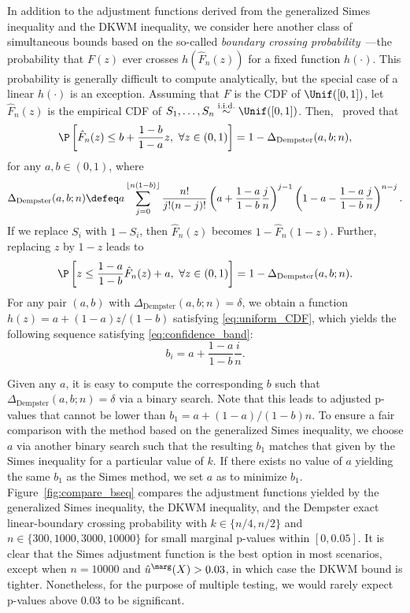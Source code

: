 In addition to the adjustment functions derived from the generalized Simes inequality and the DKWM inequality, we consider here another class of simultaneous bounds based on the so-called \emph{boundary crossing probability}~\cite{dempster1959generalized, durbin1973distribution, kotel1983computing, siegmund1986boundary}---the probability that $F(z)$ ever crosses $h(\hat{F}_{n}(z))$ for a fixed function $h(\cdot)$. This probability is generally difficult to compute analytically, but the special case of a linear $h(\cdot)$ is an exception.
Assuming that $F$ is the CDF of $\Unif([0, 1])$, let $\hat{F}_{n}(z)$ is the empirical CDF of $S_{1}, \ldots, S_{n}\stackrel{\mathrm{i.i.d.}}{\sim}\Unif([0, 1])$. Then,~\cite{dempster1959generalized} proved that
\begin{equation*}
  \P\left[ \hat{F}_{n}(z)\le b + \frac{1 - b}{1 - a}z, \,\, \forall z\in (0, 1)\right] = 1 - \Delta_{\mathrm{Dempster}}(a, b; n),
 \end{equation*}
 for any $a, b\in (0, 1)$, where
 \begin{equation}\label{eq:Delta_Dempster}
  \Delta_{\mathrm{Dempster}}(a, b; n)
  \defeq a\sum_{j=0}^{\lfloor n(1 - b)\rfloor}\frac{n!}{j!(n-j)!}\left( a + \frac{1 - a}{1 - b}\frac{j}{n}\right)^{j-1}\left( 1 - a - \frac{1 - a}{1 - b}\frac{j}{n}\right)^{n-j}.
\end{equation}
 If we replace $S_i$ with $1 - S_i$, then $\hat{F}_{n}(z)$ becomes $1 - \hat{F}_{n}(1 - z)$. Further, replacing $z$ by $1 - z$ leads to
\begin{equation}  \label{eq:dempster}
  \P\left[ z \le \frac{1 - a}{1 - b}\hat{F}_{n}(z) + a, \,\, \forall z\in (0, 1)\right] = 1 - \Delta_{\mathrm{Dempster}}(a, b; n).
\end{equation}
For any pair $(a, b)$ with $\Delta_{\mathrm{Dempster}}(a, b; n) = \delta$, we obtain a function $h(z) = a + (1 - a)z / (1 - b)$ satisfying \eqref{eq:uniform_CDF}, which yields the following sequence satisfying \eqref{eq:confidence_band}:
\[b_{i} = a + \frac{1 - a}{1 - b}\frac{i}{n}.\]

Given any $a$, it is easy to compute the corresponding $b$ such that $\Delta_{\mathrm{Dempster}}(a, b; n) = \delta$ via a binary search.
Note that this leads to adjusted p-values that cannot be lower than $b_1 = a + (1 - a) / (1 - b)n$.
To ensure a fair comparison with the method based on the generalized Simes inequality, we choose $a$ via another binary search such that the resulting $b_1$ matches that given by the Simes inequality for a particular value of $k$.
If there exists no value of $a$ yielding the same $b_1$ as the Simes method, we set $a$ as to minimize $b_1$.
Figure~\ref{fig:compare_bseq} compares the adjustment functions yielded by the generalized Simes inequality, the DKWM inequality, and the Dempster exact linear-boundary crossing probability with $k\in \{n/4, n/2\}$ and $n\in \{300, 1000, 3000, 10000\}$ for small marginal p-values within $[0, 0.05]$. It is clear that the Simes adjustment function is the best option in most scenarios, except when $n = 10000$ and $\hat{u}^\marg(X) > 0.03$, in which case the DKWM bound is tighter. Nonetheless, for the purpose of multiple testing, we would rarely expect  p-values above $0.03$ to be significant.

